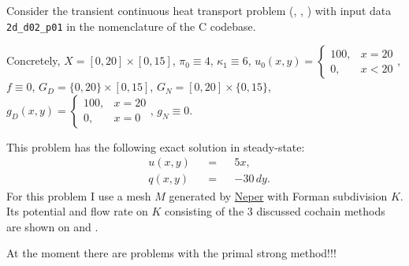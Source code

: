 \begin{example}
  \label{cmc/diffusion/continuous/transient/examples/2d_d02_p01-example}
  Consider the transient continuous heat transport problem
  (,
   ,
   )
  with input data \verb|2d_d02_p01| in the nomenclature of the C codebase.

  Concretely,
    $X = [0, 20] \times [0, 15]$,
    $\pi_0 \equiv 4$,
    $\kappa_1 \equiv 6$,
    $u_0(x, y) = \begin{cases} 100, & x = 20 \\ 0, & x < 20 \end{cases}$,
    $f \equiv 0$,
    $G_D = \{0, 20\} \times [0, 15]$,
    $G_N = [0, 20] \times \{0, 15\}$,
    $g_D(x, y) = \begin{cases} 100, & x = 20 \\ 0, & x = 0 \end{cases}$,
    $g_N \equiv 0$.

  This problem has the following exact solution in steady-state:
  \begin{subequations}
    \begin{alignat}{3}
      & u(x, y) && = && 5 x, \\
      & q(x, y) && = && - 30 \, d y.
    \end{alignat}
  \end{subequations}
  For this problem I use a mesh $M$ generated by
  \href{https://neper.info/}{Neper} with Forman subdivision $K$.
  Its potential and flow rate on $K$ consisting of the $3$ discussed cochain
  methods are shown on
  and
  .

  {\color{red} At the moment there are problems with the primal strong
  method!!!}
\end{example}

